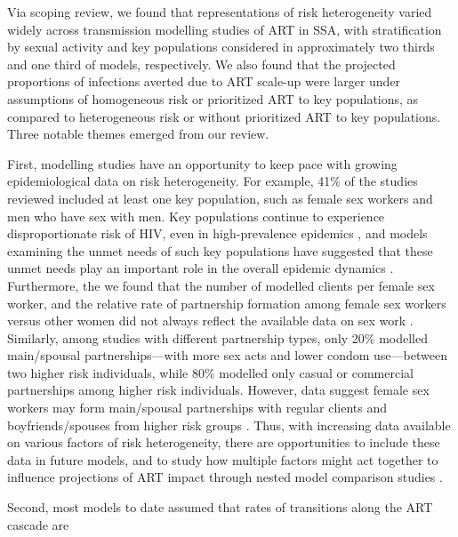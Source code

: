 Via scoping review, we found that representations of risk heterogeneity varied widely across
transmission modelling studies of ART in SSA, with
stratification by sexual activity and key populations considered in approximately
two thirds and one third of models, respectively.
We also found that the projected proportions of infections averted due to ART scale-up were
larger under assumptions of homogeneous risk or prioritized ART to key populations,
as compared to heterogeneous risk or without prioritized ART to key populations.  %
Three notable themes emerged from our review.
\par %
First, modelling studies have an opportunity to keep pace with growing epidemiological data on risk heterogeneity.
For example, 41\% of the studies reviewed included at least one key population, %
such as female sex workers and men who have sex with men.
Key populations continue to experience disproportionate risk of HIV, even in high-prevalence epidemics \cite{TODO},
and models examining the unmet needs of such key populations have suggested that
these unmet needs play an important role in the overall epidemic dynamics \cite{Stone2021,Bekker2015}.
Furthermore, the we found that the number of modelled clients per female sex worker, and
the relative rate of partnership formation among female sex workers versus other women
did not always reflect the available data on sex work \cite{Watts2010,Scorgie2012}.
Similarly, among studies with different partnership types, only 20\% modelled
main/spousal partnerships---with more sex acts and lower condom use---between two higher risk individuals,
while 80\% modelled only casual or commercial partnerships among higher risk individuals.
However, data suggest female sex workers may form main/spousal partnerships
with regular clients and boyfriends/spouses from higher risk groups \cite{Scorgie2012}.
Thus, with increasing data available on various factors of risk heterogeneity,
there are opportunities to include these data in future models,
and to study how multiple factors might act together to influence projections of ART impact
through nested model comparison studies \cite{Dodd2010,Hontelez2013}.
\par
Second, most models to date assumed that rates of transitions along the ART cascade are

